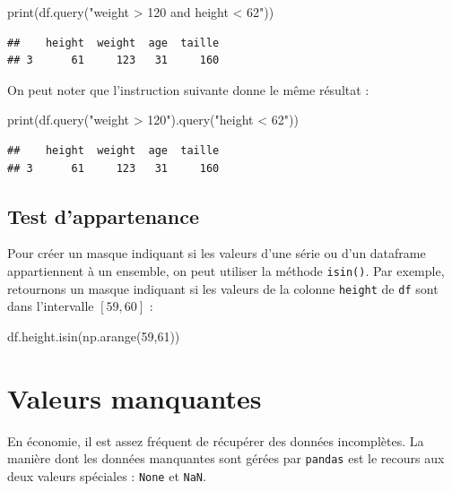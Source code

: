 \documentclass[12pt,]{book}
\newenvironment{Shaded}{\begin{snugshade}}{\end{snugshade}}
\newcommand{\DecValTok}[1]{\textcolor[rgb]{0.00,0.00,0.81}{#1}}
\newcommand{\StringTok}[1]{\textcolor[rgb]{0.31,0.60,0.02}{#1}}
\newcommand{\BuiltInTok}[1]{#1}
\newcommand{\NormalTok}[1]{#1}
\numberwithin{equation}{section}
\numberwithin{countremarque}{section}
\begin{document}
\begin{Shaded}
\begin{Highlighting}[]
\BuiltInTok{print}\NormalTok{(df.query(}\StringTok{"weight > 120 and height < 62"}\NormalTok{))}
\end{Highlighting}
\end{Shaded}

\begin{lstlisting}
##    height  weight  age  taille
## 3      61     123   31     160
\end{lstlisting}

On peut noter que l'instruction suivante donne le même résultat :

\begin{Shaded}
\begin{Highlighting}[]
\BuiltInTok{print}\NormalTok{(df.query(}\StringTok{"weight > 120"}\NormalTok{).query(}\StringTok{"height < 62"}\NormalTok{))}
\end{Highlighting}
\end{Shaded}

\begin{lstlisting}
##    height  weight  age  taille
## 3      61     123   31     160
\end{lstlisting}

\subsection{Test d'appartenance}\label{test-dappartenance-2}

Pour créer un masque indiquant si les valeurs d'une série ou d'un
dataframe appartiennent à un ensemble, on peut utiliser la méthode
\texttt{isin()}. Par exemple, retournons un masque indiquant si les
valeurs de la colonne \texttt{height} de \texttt{df} sont dans
l'intervalle \([59,60]\) :

\begin{Shaded}
\begin{Highlighting}[]
\NormalTok{df.height.isin(np.arange(}\DecValTok{59}\NormalTok{,}\DecValTok{61}\NormalTok{))}
\end{Highlighting}
\end{Shaded}

\section{Valeurs manquantes}\label{valeurs-manquantes}

En économie, il est assez fréquent de récupérer des données incomplètes.
La manière dont les données manquantes sont gérées par \texttt{pandas}
est le recours aux deux valeurs spéciales : \texttt{None} et
\texttt{NaN}.
\end{document}
